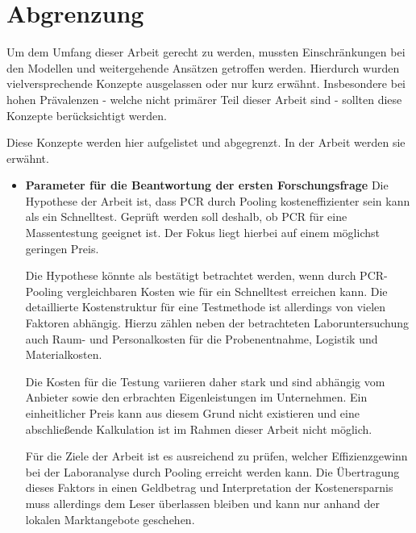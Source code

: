 \section{Abgrenzung}
Um dem Umfang dieser Arbeit gerecht zu werden, mussten Einschränkungen bei den Modellen und weitergehende Ansätzen getroffen werden.
Hierdurch wurden vielversprechende Konzepte ausgelassen oder nur kurz erwähnt.
Insbesondere bei hohen Prävalenzen - welche nicht primärer Teil dieser Arbeit sind - sollten diese Konzepte berücksichtigt werden.

Diese Konzepte werden hier aufgelistet und abgegrenzt.
In der Arbeit werden sie erwähnt.

\begin{itemize}
	\item\textbf{Parameter für die Beantwortung der ersten Forschungsfrage}\newline
	Die Hypothese der Arbeit ist, dass PCR durch Pooling kosteneffizienter sein kann als ein Schnelltest.
	Geprüft werden soll deshalb, ob PCR für eine Massentestung geeignet ist.
	Der Fokus liegt hierbei auf einem möglichst geringen Preis.
	
	Die Hypothese könnte als bestätigt betrachtet werden, wenn durch PCR-Pooling vergleichbaren Kosten wie für ein Schnelltest erreichen kann.
	Die detaillierte Kostenstruktur für eine Testmethode ist allerdings von vielen Faktoren abhängig.
	Hierzu zählen neben der betrachteten Laboruntersuchung auch Raum- und Personalkosten für die Probenentnahme, Logistik und Materialkosten.
	
	Die Kosten für die Testung variieren daher stark und sind abhängig vom Anbieter sowie den erbrachten Eigenleistungen im Unternehmen.
	Ein einheitlicher Preis kann aus diesem Grund nicht existieren und eine abschließende Kalkulation ist im Rahmen dieser Arbeit nicht möglich.
	
	Für die Ziele der Arbeit ist es  ausreichend zu prüfen, welcher Effizienzgewinn bei der Laboranalyse durch Pooling erreicht werden kann.
	Die Übertragung dieses Faktors in einen Geldbetrag und Interpretation der Kostenersparnis muss allerdings dem Leser überlassen bleiben und kann nur anhand der lokalen Marktangebote geschehen.
		

\end{itemize}
